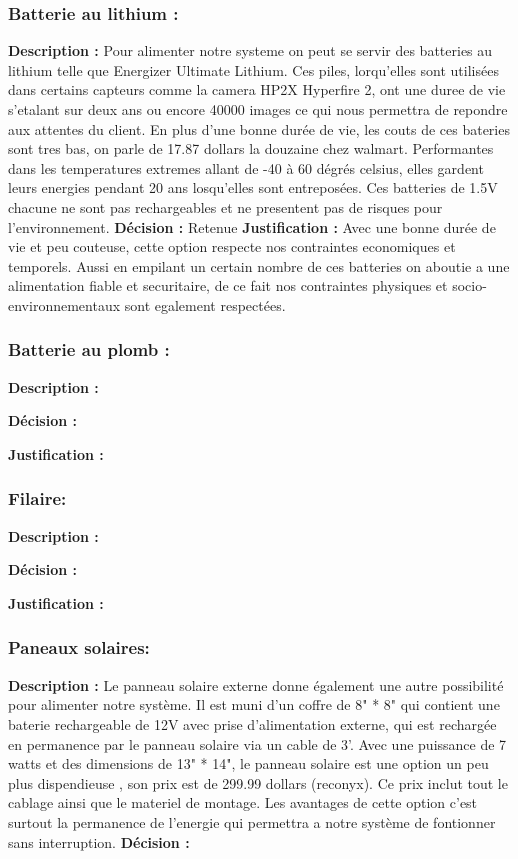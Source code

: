  \subsubsection{Batterie au lithium :}
 \textbf{Description :}
 Pour alimenter notre systeme on peut se servir des batteries au lithium telle que  Energizer Ultimate Lithium. Ces piles, lorqu'elles sont utilisées dans certains capteurs comme la camera HP2X Hyperfire 2, ont une duree de vie s'etalant sur deux ans ou encore 40000 images ce qui nous permettra de repondre aux attentes du client. En plus d'une bonne durée de vie, les couts de ces bateries sont tres bas, on parle de 17.87 dollars la douzaine chez walmart. Performantes dans les temperatures extremes allant de -40 à 60 dégrés celsius, elles gardent leurs energies pendant 20 ans losqu'elles sont entreposées. Ces batteries de 1.5V chacune ne sont pas rechargeables et ne presentent pas de risques pour l'environnement.
 \textbf{Décision :}
 Retenue
 \textbf{Justification :}
 Avec une bonne durée de vie et peu couteuse, cette option respecte nos contraintes economiques et temporels. Aussi en empilant un certain nombre de ces batteries on aboutie a une alimentation fiable et securitaire, de ce fait nos contraintes physiques et socio-environnementaux sont egalement respectées.
 \subsubsection{Batterie au plomb :}
 \textbf{Description :}
 
 \textbf{Décision :}
 
 \textbf{Justification :}
 
 \subsubsection{Filaire:}
 \textbf{Description :}
 
 \textbf{Décision :}
 
 \textbf{Justification :}
 
 \subsubsection{Paneaux solaires:}
 \textbf{Description :}
  Le panneau solaire externe donne également une autre possibilité pour alimenter notre système. Il est muni d'un coffre de 8" * 8" qui contient une baterie rechargeable de 12V avec prise d'alimentation externe, qui est rechargée en permanence par le panneau solaire via un cable de 3'. Avec une puissance de 7 watts et des dimensions de 13" * 14", le panneau solaire est une option un peu plus dispendieuse , son prix est de 299.99 dollars (reconyx). Ce prix inclut tout le cablage ainsi que le materiel de montage. Les avantages de cette option c'est surtout la permanence de l'energie qui permettra a notre système de fontionner sans interruption.
 \textbf{Décision :}
 

